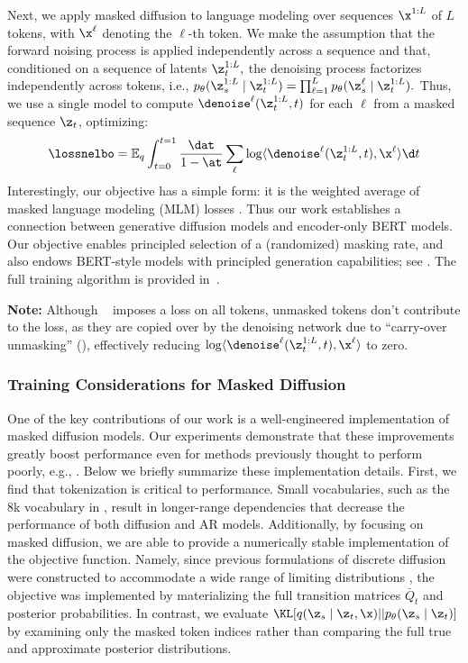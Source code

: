 \documentclass{article} %
\begin{document}
Next, we apply masked diffusion to language modeling over sequences $\x^{1:L}$ of $L$ tokens, with $\x^{\ell}$ denoting the $\ell$-th token.
We make the assumption that the forward noising process is applied independently across a sequence and that, conditioned on a sequence of latents $\z_t^{1:L},$ the denoising process factorizes independently across tokens, i.e., $p_\theta(\z_s^{1:L} \mid \z_t^{1:L}) = \prod_{\ell=1}^Lp_\theta(\z_s^{\ell} \mid \z_t^{1:L}).$
Thus, we use a single model to compute $\denoise^\ell(\z_t^{1:L}, t)$ for each $\ell$ from a masked sequence $\z_t$, optimizing:
\begin{align}\label{eqn:dif_loss_cont_subs_multidim}
    \lossnelbo = \mathbb{E}_{q}\int_{t=0}^{t=1} \frac{\dat}{1 - \at} \sum_{\ell} \log \langle \denoise^\ell(\z_t^{1:L}, t), \x^\ell \rangle \d t
\end{align}
Interestingly, our
objective has a simple form: it is the weighted average of masked language modeling (MLM) losses \citep{devlin2018bert}.
Thus our work establishes a connection between generative diffusion models and encoder-only BERT models. Our objective enables principled selection of a (randomized) masking rate, and also endows BERT-style models with principled generation capabilities; see . The full training algorithm is provided in~.

\textbf{Note:} Although ~ imposes a loss on all tokens, unmasked tokens don't contribute to the loss, as they are copied over by the denoising network due to “carry-over unmasking” (), effectively reducing $\log \langle \denoise^\ell(\z_t^{1:L}, t), \x^\ell \rangle$ to zero.

\subsubsection{Training Considerations for Masked Diffusion}\label{subsubsec:improved_implementation}
One of the key contributions of our work is a well-engineered implementation of masked diffusion models.
Our experiments demonstrate that these improvements greatly boost performance even for methods previously thought to perform poorly, e.g., \citet{austin2021structured}. 
Below we briefly summarize these implementation details.
First, we find that tokenization is critical to performance.
Small vocabularies, such as the 8k vocabulary in \citet{austin2021structured}, result in longer-range dependencies that decrease the performance of both diffusion and AR models.
Additionally, by focusing on masked diffusion, we are able to provide a numerically stable implementation of the objective function.
Namely, since previous formulations of discrete diffusion were constructed to accommodate a wide range of limiting distributions \citep{austin2021structured}, the objective was implemented by materializing the full transition matrices $\bar{Q}_t$ and posterior probabilities.
In contrast, we evaluate $\KL[q(\z_s \mid \z_t, \x)||p_\theta(\z_s\mid\z_t)]$ by examining only the masked token indices rather than comparing the full true and approximate posterior distributions.
\end{document}
